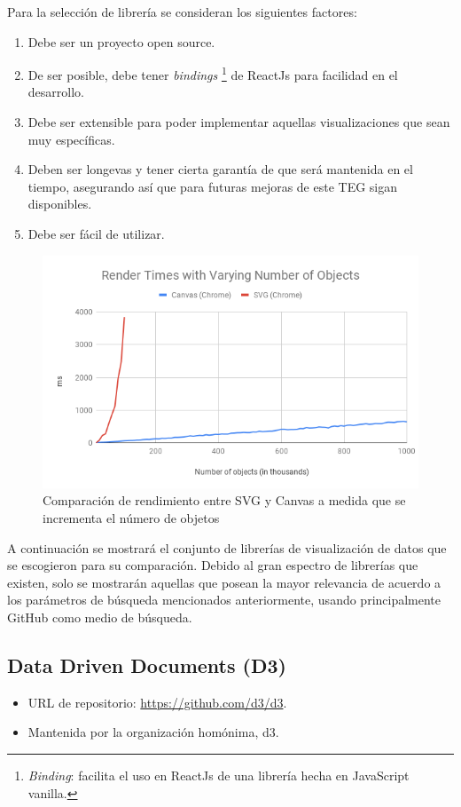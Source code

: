 Para la selección de librería se consideran los siguientes factores:

\begin{enumerate}
    \item {Debe ser un proyecto open source.}
    \item {De ser posible, debe tener \textit{bindings} \footnote{\textit{Binding}: facilita el uso en ReactJs de una librería hecha en JavaScript vanilla.} de ReactJs para facilidad en el desarrollo.}
    \item {Debe ser extensible para poder implementar aquellas visualizaciones que sean muy específicas.}
    \item {Deben ser longevas y tener cierta garantía de que será mantenida en el tiempo,
    asegurando así que para futuras mejoras de este TEG sigan disponibles.}
    \item {Debe ser fácil de utilizar.}
\end{enumerate}

\begin{figure}[H]
    \centering
    \includegraphics[width=\textwidth]{seminario/images/svg-vs-canvas.png}
    \caption{Comparación de rendimiento entre SVG y Canvas a medida que se incrementa el número de objetos\cite{WhenToUseHTMLCanvas}}
    \label{fig:canvasvssvg}
\end{figure}

A continuación se mostrará el conjunto de librerías de visualización de datos que se escogieron para su comparación. Debido al gran espectro de librerías que existen, solo se mostrarán aquellas que posean la mayor relevancia de acuerdo a los parámetros de búsqueda mencionados anteriormente, usando principalmente GitHub como medio de búsqueda.

\subsection{ Data Driven Documents (D3) }
\begin{itemize}
    \item URL de repositorio: \href{https://github.com/d3/d3}{https://github.com/d3/d3}.
    \item Mantenida por la organización homónima, d3.
\end{itemize}

